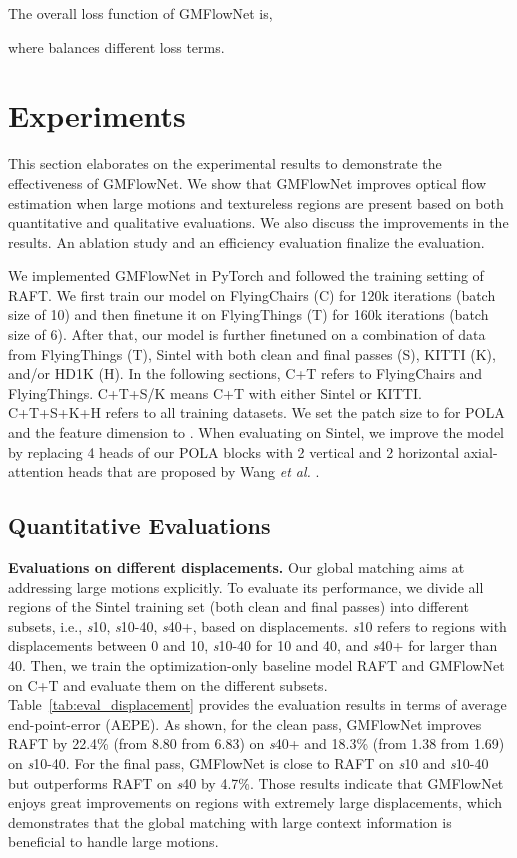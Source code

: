 \documentclass[10pt,twocolumn,letterpaper]{article}
\begin{document}
The overall loss function of GMFlowNet is, 

where  balances different loss terms.




\section{Experiments}

This section elaborates on the experimental results to demonstrate the effectiveness of GMFlowNet. We show that GMFlowNet improves optical flow estimation when large motions and textureless regions are present based on both quantitative and qualitative evaluations. We also discuss the improvements in the results. 
An ablation study and an efficiency evaluation finalize the evaluation.

We implemented GMFlowNet in PyTorch \cite{paszke2019pytorch} and followed the training setting of RAFT\cite{teed2020raft}. 
We first train our model on FlyingChairs\cite{ilg2017flownet} (C) for 120k iterations (batch size of 10) and then finetune it on FlyingThings\cite{mayer2016large} (T) for 160k iterations (batch size of 6). 
After that, our model is further finetuned on a combination of data from FlyingThings (T), Sintel with both clean and final passes \cite{butler2012naturalistic} (S), KITTI\cite{menze2015object} (K), and/or HD1K\cite{kondermann2016hci} (H).
In the following sections, C+T refers to FlyingChairs and FlyingThings. C+T+S/K means C+T with either Sintel or KITTI. C+T+S+K+H refers to all training datasets.
We set the patch size to  for POLA and the feature dimension to .
When evaluating on Sintel, we improve the model by replacing 4 heads of our POLA blocks with 2 vertical and 2 horizontal axial-attention heads that are proposed by Wang \emph{et al.} \cite{wang2020axial}. 


\subsection{Quantitative Evaluations}

{\bf Evaluations on different displacements.}
Our global matching aims at addressing large motions explicitly. To evaluate its performance, we divide all regions of the Sintel training set (both clean and final passes) into different subsets, i.e., \emph{s}10, \emph{s}10-40, \emph{s}40+, based on displacements. \emph{s}10 refers to regions with displacements between 0 and 10, \emph{s}10-40 for 10 and 40, and \emph{s}40+ for larger than 40. Then, we train the optimization-only baseline model RAFT \cite{teed2020raft} and GMFlowNet on C+T and evaluate them on the different subsets. 
Table~\ref{tab:eval_displacement} provides the evaluation results in terms of average end-point-error (AEPE). 
As shown, for the clean pass, GMFlowNet improves RAFT by 22.4\% (from 8.80 from 6.83) on \emph{s}40+ and 18.3\% (from 1.38 from 1.69) on \emph{s}10-40. 
For the final pass, GMFlowNet is close to RAFT on \emph{s}10 and \emph{s}10-40 but outperforms RAFT on \emph{s}40 by 4.7\%. 
Those results indicate that GMFlowNet enjoys great improvements on regions with extremely large displacements, which demonstrates that the global matching with large context information is beneficial to handle large motions.
\end{document}
